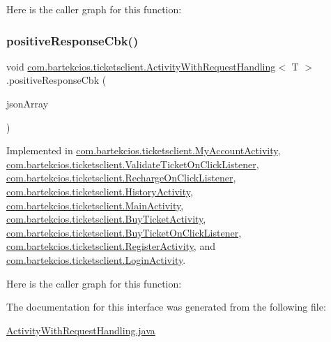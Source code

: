 Here is the caller graph for this function\+:
\mbox{\label{interfacecom_1_1bartekcios_1_1ticketsclient_1_1_activity_with_request_handling_a43459b5f0cede2697cc0c1e214462098}} 
\subsubsection{\texorpdfstring{positive\+Response\+Cbk()}{positiveResponseCbk()}}
{\footnotesize\ttfamily void \hyperlink{interfacecom_1_1bartekcios_1_1ticketsclient_1_1_activity_with_request_handling}{com.\+bartekcios.\+ticketsclient.\+Activity\+With\+Request\+Handling}$<$ T $>$.positive\+Response\+Cbk (\begin{DoxyParamCaption}\item[{J\+S\+O\+N\+Array}]{json\+Array }\end{DoxyParamCaption})}



Implemented in \hyperlink{classcom_1_1bartekcios_1_1ticketsclient_1_1_my_account_activity_a93fbbfcbbd1ad14a90b5d4ec9c736dbf}{com.\+bartekcios.\+ticketsclient.\+My\+Account\+Activity}, \hyperlink{classcom_1_1bartekcios_1_1ticketsclient_1_1_validate_ticket_on_click_listener_a2fdd057515d2e8d99d1e1cb5a5307110}{com.\+bartekcios.\+ticketsclient.\+Validate\+Ticket\+On\+Click\+Listener}, \hyperlink{classcom_1_1bartekcios_1_1ticketsclient_1_1_recharge_on_click_listener_a23daefa79eaa242798ab94f1fee5dd16}{com.\+bartekcios.\+ticketsclient.\+Recharge\+On\+Click\+Listener}, \hyperlink{classcom_1_1bartekcios_1_1ticketsclient_1_1_history_activity_afa872a5d1933552d0a7cb87383341dc4}{com.\+bartekcios.\+ticketsclient.\+History\+Activity}, \hyperlink{classcom_1_1bartekcios_1_1ticketsclient_1_1_main_activity_a0c44c46c29fb27debcc210af8b4c79f0}{com.\+bartekcios.\+ticketsclient.\+Main\+Activity}, \hyperlink{classcom_1_1bartekcios_1_1ticketsclient_1_1_buy_ticket_activity_a9b1bc6b8adc4010019ce154dab685ae3}{com.\+bartekcios.\+ticketsclient.\+Buy\+Ticket\+Activity}, \hyperlink{classcom_1_1bartekcios_1_1ticketsclient_1_1_buy_ticket_on_click_listener_a1beb64e34d22d664b04d15d6f88e70d2}{com.\+bartekcios.\+ticketsclient.\+Buy\+Ticket\+On\+Click\+Listener}, \hyperlink{classcom_1_1bartekcios_1_1ticketsclient_1_1_register_activity_ac6ff244e4175ca87432b78be7c507d66}{com.\+bartekcios.\+ticketsclient.\+Register\+Activity}, and \hyperlink{classcom_1_1bartekcios_1_1ticketsclient_1_1_login_activity_a0d61bd01e94ea4593cd584a3950b8249}{com.\+bartekcios.\+ticketsclient.\+Login\+Activity}.

Here is the caller graph for this function\+:


The documentation for this interface was generated from the following file\+:\begin{DoxyCompactItemize}
\item 
\hyperlink{_activity_with_request_handling_8java}{Activity\+With\+Request\+Handling.\+java}\end{DoxyCompactItemize}
